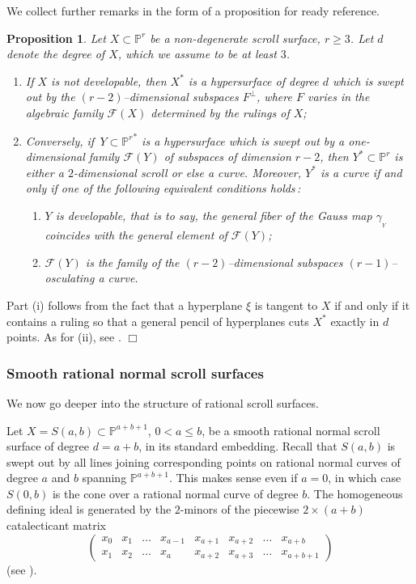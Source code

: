 \documentclass[11pt]{article}   %
\newtheorem{Proposition}[Theorem]{Proposition}
\theoremstyle{definition}
\numberwithin{Theorem}{section} \numberwithin{equation}{section}
\def\demo{\noindent{\it Proof. }}
\def\QED{\hfill$\Box$}
\def\qed{\QED}
\newcommand{\F}{{\mathcal F}}
\newcommand{\p}{{\mathbb P}}
\begin{document}
{{We collect further remarks in the form of a proposition for ready
reference.

\begin{Proposition}\label{non_developable} Let $X\subset \p^ r$ be a
non-degenerate scroll surface, $r\geq 3$.
Let $d$ denote the degree of $X$, which we assume to be at least $3$.
\begin{enumerate}
\item[{\rm (i)}] If  $X$ is not developable, then $X^*$ is a hypersurface of degree
$d$ which is swept out by the $(r-2)$--dimensional subspaces $F^
\perp$, where $F$ varies in the algebraic family $\F(X)$ determined
by the rulings of $X${\rm ;}
\item[{\rm (ii)}] Conversely, if $\,Y\subset {\p^ r}^ *$ is a hypersurface which is
swept out by a one-dimensional family $\mathcal F(Y)$ of subspaces of
dimension $r-2$, then $Y^ *\subset \p^r$ is either a $2$-dimensional
scroll or else a curve. Moreover, $Y^ *$ is a curve if and only if
one of the following equivalent conditions holds{\rm $\,$:}
\begin{enumerate}
\item[{\rm (a)}] $Y$ is \emph{developable}, that is to say, the general fiber of
the Gauss map $\gamma_{_Y}$  coincides with the general element of
$\mathcal F(Y)${\rm ;}
\item[{\rm (b)}] $\mathcal F(Y)$ is the family of the $(r-2)$--dimensional
subspaces $(r-1)$--osculating a curve.
\end{enumerate}
\end{enumerate}
\end{Proposition}
\demo Part (i) follows from the fact that a hyperplane $\xi$ is
tangent to $X$ if and only if it contains a ruling so that a general pencil
of hyperplanes cuts $X^*$ exactly in $d$ points. As
for (ii), see \cite[{Section}
2]{GH}. \qed

\subsubsection{Smooth rational normal scroll surfaces}\label{RNS}

We now go deeper into the structure of  rational
scroll surfaces.

Let $X=S(a,b)\subset\p^{a+b+1}$, $0<a\leq b$, be a smooth rational
normal scroll surface of degree $d=a+b$, in its standard embedding.
Recall that $S(a,b)$ is swept out by all lines joining corresponding
points on rational normal curves of degree $a$ and $b$ spanning
$\p^{a+b+1}$. This makes sense even if $a=0$, in which case $S(0,b)$
is the cone over a rational normal curve of degree $b$.
The homogeneous defining ideal is generated by the $2$-minors
of the piecewise $2\times(a+b)$ catalecticant matrix
$$\left(\begin{array}{cccc|cccc}
x_0 & x_1 & \ldots & x_{a-1} & x_{a+1} & x_{a+2} & \ldots & x_{a+b}\\
x_1 & x_2 & \ldots & x_{a} & x_{a+2} & x_{a+3} & \ldots & x_{a+b+1}
\end{array}
\right) $$
(see \cite {EH}).


}}
\end{document}
